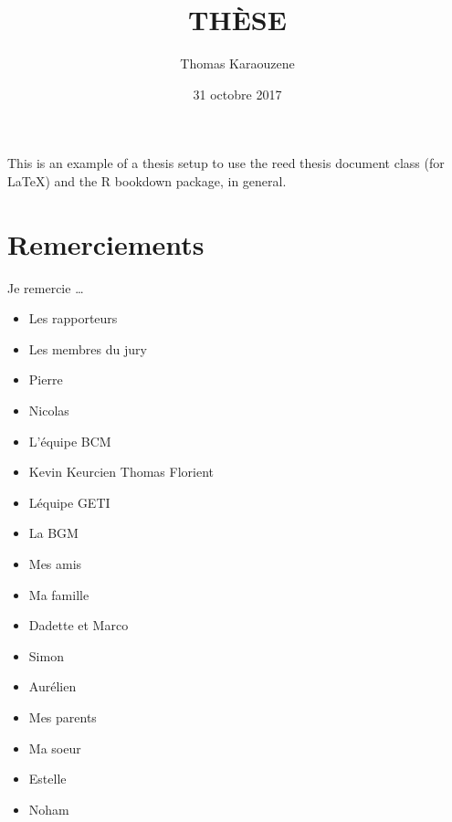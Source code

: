 \documentclass[12pt,twoside]{reedthesis}
\title{THÈSE}
\author{Thomas Karaouzene}
\date{31 octobre 2017}
\theoremstyle{definition}
\theoremstyle{definition}
\theoremstyle{remark}
\begin{document}
      \maketitle
  
  \frontmatter %
  \pagestyle{empty} %

  
      \begin{preface}
      This is an example of a thesis setup to use the reed thesis document
      class (for LaTeX) and the R bookdown package, in general.
    \end{preface}
  
      \hypersetup{linkcolor=black}
    \setcounter{tocdepth}{3}
    \tableofcontents
  
      \listoftables
  
      \listoffigures
  
  
  
  \mainmatter %
  \pagestyle{fancyplain} %

  \chapter*{Remerciements}\label{remerciements}
  
  Je remercie \ldots{}
  
  \begin{itemize}
  \item
    Les rapporteurs
  \item
    Les membres du jury\\
  \item
    Pierre\\
  \item
    Nicolas\\
  \item
    L'équipe BCM\\
  \item
    Kevin Keurcien Thomas Florient\\
  \item
    Léquipe GETI\\
  \item
    La BGM
  \item
    Mes amis\\
  \item
    Ma famille
  \item
    Dadette et Marco\\
  \item
    Simon\\
  \item
    Aurélien
  \item
    Mes parents\\
  \item
    Ma soeur
  \item
    Estelle\\
  \item
    Noham
  \end{itemize}
  
\end{document}
